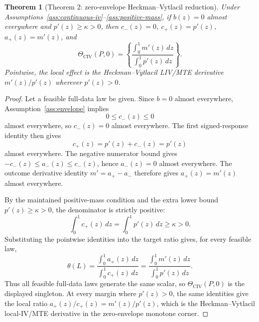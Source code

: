 \documentclass[11pt]{article}
\theoremstyle{definition}
\theoremstyle{plain}
\newtheorem{theorem}{Theorem}
\theoremstyle{remark}
\begin{document}
\begin{theorem}[Theorem 2: zero-envelope Heckman--Vytlacil reduction]\label{thm:zero-envelope}
Under Assumptions~\ref{ass:continuous-iv}--\ref{ass:positive-mass}, if \(b(z)=0\) almost everywhere and \(p'(z)\ge\kappa>0\), then \(c_-(z)=0\), \(c_+(z)=p'(z)\), \(a_+(z)=m'(z)\), and
\[
\Theta_{\mathrm{CIV}}(P,0)=
\left\{
\frac{\int_0^1 m'(z)\,dz}{\int_0^1 p'(z)\,dz}
\right\}.
\]
Pointwise, the local effect is the Heckman--Vytlacil LIV/MTE derivative \(m'(z)/p'(z)\) wherever \(p'(z)>0\).
\end{theorem}
\begin{proof}
Let a feasible full-data law be given.  Since \(b=0\) almost everywhere, Assumption~\ref{ass:envelope} implies
\[
0\le c_-(z)\le0
\]
almost everywhere, so \(c_-(z)=0\) almost everywhere.  The first signed-response identity then gives
\[
c_+(z)=p'(z)+c_-(z)=p'(z)
\]
almost everywhere.  The negative numerator bound gives \(-c_-(z)\le a_-(z)\le c_-(z)\), hence \(a_-(z)=0\) almost everywhere.  The outcome derivative identity \(m'=a_+-a_-\) therefore gives \(a_+(z)=m'(z)\) almost everywhere.

By the maintained positive-mass condition and the extra lower bound \(p'(z)\ge\kappa>0\), the denominator is strictly positive:
\[
\int_0^1 c_+(z)\,dz=\int_0^1 p'(z)\,dz\ge\kappa>0.
\]
Substituting the pointwise identities into the target ratio gives, for every feasible law,
\[
\theta(L)=\frac{\int_0^1 a_+(z)\,dz}{\int_0^1 c_+(z)\,dz}
=\frac{\int_0^1 m'(z)\,dz}{\int_0^1 p'(z)\,dz}.
\]
Thus all feasible full-data laws generate the same scalar, so \(\Theta_{\mathrm{CIV}}(P,0)\) is the displayed singleton.  At every margin where \(p'(z)>0\), the same identities give the local ratio \(a_+(z)/c_+(z)=m'(z)/p'(z)\), which is the Heckman--Vytlacil local-IV/MTE derivative in the zero-envelope monotone corner.
\end{proof}
\end{document}
